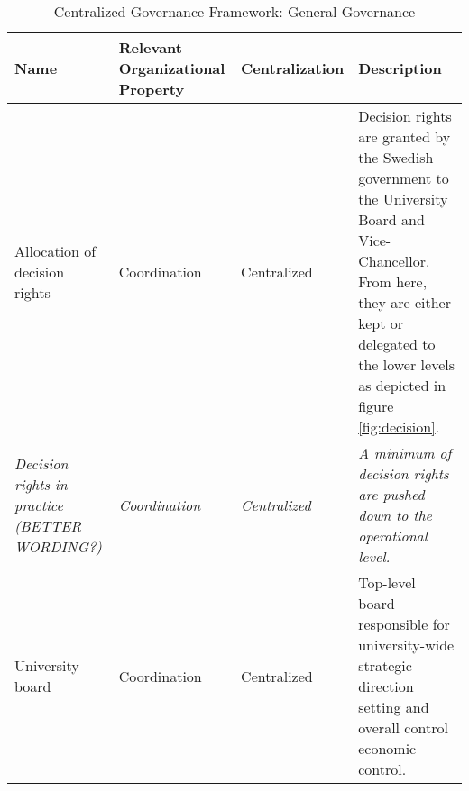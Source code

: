 \begin{table}[H]
\caption{Centralized Governance Framework: General Governance}
\label{table:centralGeneralGovernance}
\begin{tabular}{ | p{} | p{}| p{} | p{}|}
%
\hline
%
\textbf{Name} & 
\textbf{Relevant Organizational Property} &
\textbf{Centralization} &  
\textbf{Description} \\
%
\hline
%
 Allocation of decision rights & 
 Coordination &
 Centralized & 
 Decision rights are granted by the Swedish government to the University Board and Vice-Chancellor. From here, they are either kept or delegated to the lower levels as depicted in figure \ref{fig:decision}. \\
%
\hline
%
 \textit{Decision rights in practice (BETTER WORDING?)} & 
 \textit{Coordination} &
 \textit{Centralized} & 
 \textit{A minimum of decision rights are pushed down to the operational level.} \\
%
\hline
%
%
%
 University board &
 Coordination &
 Centralized &
 Top-level board responsible for university-wide strategic direction setting and overall control economic control. \\
%
\hline
%
 

\end{tabular}
\end{table}
